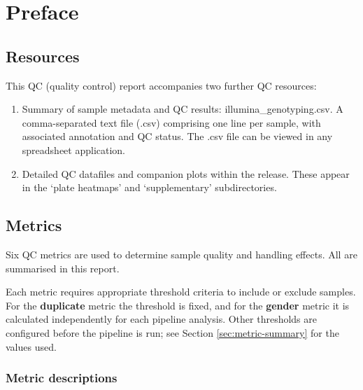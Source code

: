 

\section{Preface}

\subsection{Resources}

This QC (quality control) report accompanies two further QC resources:
\begin{enumerate}
\item Summary of sample metadata and QC results: illumina\_genotyping.csv.  A comma-separated text file (.csv) comprising one line per sample, with associated annotation and QC status.  The .csv file can be viewed in any spreadsheet application.
\item Detailed QC datafiles and companion plots within the release.  These appear in the `plate heatmaps' and `supplementary' subdirectories.
\end{enumerate}

\subsection{Metrics}

Six QC metrics are used to determine sample quality and handling effects.  All are summarised in this report.

Each metric requires appropriate threshold criteria to include or exclude samples.  For the \textbf{duplicate} metric the threshold is fixed, and for the \textbf{gender} metric it is calculated independently for each pipeline analysis.  Other thresholds are configured before the pipeline is run; see Section \ref{sec:metric-summary} for the values used.

\subsubsection*{Metric descriptions}

